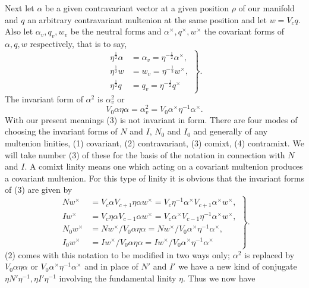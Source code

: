 \documentclass[11pt]{article}
\begin{document}
\indent Next let $\alpha$ be a given contravariant vector at a given position $\rho$ of our manifold and $q$ an arbitrary contravariant multenion at the same position and let $w=V_cq$. Also let $\alpha_v,q_v,w_v$ be the neutral forms and $\alpha^\times,q^\times,w^\times$ the covariant forms of $\alpha,q,w$ respectively, that is to say,
\begin{equation}\left.\begin{aligned}\eta^{\frac12}\alpha&=\alpha_v=\eta^{-\frac12}\alpha^\times,\\\eta^{\frac12}w&=w_v=\eta^{-\frac12}w^\times,\\\eta^{\frac12}q&=q_v=\eta^{-\frac12}q^\times\end{aligned}\right\}.\tag{4}\end{equation}
The invariant form of $\alpha^2$ is $\alpha_v^2$ or
\begin{equation}V_0\alpha\eta\alpha=\alpha_v^2=V_0\alpha^\times\eta^{-1}\alpha^\times.\tag{5}\end{equation}
With our present meanings (3) is not invariant in form. There are four modes of choosing the invariant forms of $N$ and $I$, $N_0$ and $I_0$ and generally of any multenion linities, (1) covariant, (2) contravariant, (3) comixt, (4) contramixt. We will take number (3) of these for the basis of the notation in connection with $N$ and $I$. A comixt linity means one which acting on a covariant multenion produces a covariant multenion. For this type of linity it is obvious that the invariant forms of (3) are given by
\begin{equation}\left.\begin{aligned}
Nw^\times&=V_c\alpha V_{c+1}\eta\alpha w^\times=V_c\eta^{-1}\alpha^\times V_{c+1}\alpha^\times w^\times,\\
Iw^\times&=V_c\eta\alpha V_{c-1}\alpha w^\times=V_c\alpha^\times V_{c-1}\eta^{-1}\alpha^\times w^\times,\\
N_0w^\times&=Nw^\times/V_0\alpha\eta\alpha=Nw^\times/V_0\alpha^\times\eta^{-1}\alpha^\times,\\
I_0w^\times&=Iw^\times/V_0\alpha\eta\alpha=Iw^\times/V_0\alpha^\times\eta^{-1}\alpha^\times
\end{aligned}\right\}.\tag{6}\end{equation}
(2) comes with this notation to be modified in two ways only; $\alpha^2$ is replaced by $V_0\alpha\eta\alpha$ or $V_0\alpha^\times\eta^{-1}\alpha^\times$ and in place of $N'$ and $I'$ we have a new kind of conjugate $\eta N'\eta^{-1},\eta I'\eta^{-1}$ involving the fundamental linity $\eta$. Thus we now have
\end{document}
